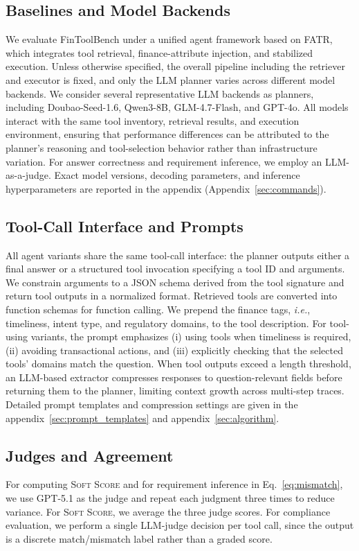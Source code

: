 \documentclass[sigconf,nonacm]{acmart}
\newcommand{\soft}{\textsc{Soft Score}\xspace}
\begin{document}
\subsection{Baselines and Model Backends}
We evaluate FinToolBench under a unified agent framework based on FATR, which integrates tool retrieval, finance-attribute injection, and stabilized execution.
Unless otherwise specified, the overall pipeline including the retriever and executor is fixed, and only the LLM planner varies across different model backends.
We consider several representative LLM backends as planners, including Doubao-Seed-1.6, Qwen3-8B, GLM-4.7-Flash, and GPT-4o.
All models interact with the same tool inventory, retrieval results, and execution environment, ensuring that performance differences can be attributed to the planner’s reasoning and tool-selection behavior rather than infrastructure variation.
For answer correctness and requirement inference, we employ an LLM-as-a-judge.
Exact model versions, decoding parameters, and inference hyperparameters are reported in the appendix (Appendix~\ref{sec:commands}).

\subsection{Tool-Call Interface and Prompts}
All agent variants share the same tool-call interface: the planner outputs either a final answer or a structured tool invocation specifying a tool ID and arguments.
We constrain arguments to a JSON schema derived from the tool signature and return tool outputs in a normalized format.
Retrieved tools are converted into function schemas for function calling. We prepend the finance tags, \textit{i.e.}, timeliness, intent type, and regulatory domains, to the tool description.
For tool-using variants, the prompt emphasizes (i) using tools when timeliness is required, (ii) avoiding transactional actions, and (iii) explicitly checking that the selected tools' domains match the question.
When tool outputs exceed a length threshold, an LLM-based extractor compresses responses to question-relevant fields before returning them to the planner, limiting context growth across multi-step traces.
Detailed prompt templates and compression settings are given in the appendix~\ref{sec:prompt_templates} and appendix~\ref{sec:algorithm}.

\subsection{Judges and Agreement}
For computing \soft and for requirement inference in Eq.~\eqref{eq:mismatch}, we use GPT-5.1 as the judge and repeat each judgment three times to reduce variance.
For \soft, we average the three judge scores. 
For compliance evaluation, we perform a single LLM-judge decision per tool call, since the output is a discrete match/mismatch label rather than a graded score.
\end{document}
